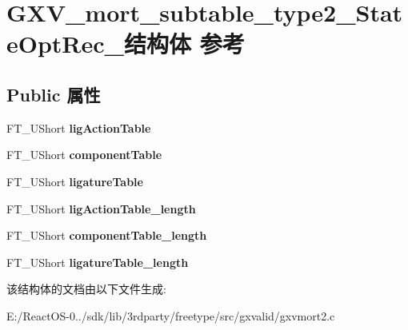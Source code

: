 \hypertarget{struct_g_x_v__mort__subtable__type2___state_opt_rec__}{}\section{G\+X\+V\+\_\+mort\+\_\+subtable\+\_\+type2\+\_\+\+State\+Opt\+Rec\+\_\+结构体 参考}
\label{struct_g_x_v__mort__subtable__type2___state_opt_rec__}
\subsection*{Public 属性}
\begin{DoxyCompactItemize}
\item 
\mbox{\label{struct_g_x_v__mort__subtable__type2___state_opt_rec___a7dacb9653cfacad1fd7808d98d459ade}} 
F\+T\+\_\+\+U\+Short {\bfseries lig\+Action\+Table}
\item 
\mbox{\label{struct_g_x_v__mort__subtable__type2___state_opt_rec___a4bc582ada04e0ac8cdea2c0381e2ae5c}} 
F\+T\+\_\+\+U\+Short {\bfseries component\+Table}
\item 
\mbox{\label{struct_g_x_v__mort__subtable__type2___state_opt_rec___a6b3fda0a7f13b9661c1043f69cd2b006}} 
F\+T\+\_\+\+U\+Short {\bfseries ligature\+Table}
\item 
\mbox{\label{struct_g_x_v__mort__subtable__type2___state_opt_rec___a823b7aec8c245846e2765c4271b6fbdf}} 
F\+T\+\_\+\+U\+Short {\bfseries lig\+Action\+Table\+\_\+length}
\item 
\mbox{\label{struct_g_x_v__mort__subtable__type2___state_opt_rec___ab9dd94ae444a1041a4b5d15aeb5b762b}} 
F\+T\+\_\+\+U\+Short {\bfseries component\+Table\+\_\+length}
\item 
\mbox{\label{struct_g_x_v__mort__subtable__type2___state_opt_rec___a5a84c4f5f16c584aafbc43f0b84f681b}} 
F\+T\+\_\+\+U\+Short {\bfseries ligature\+Table\+\_\+length}
\end{DoxyCompactItemize}


该结构体的文档由以下文件生成\+:\begin{DoxyCompactItemize}
\item 
E\+:/\+React\+O\+S-\/0../sdk/lib/3rdparty/freetype/src/gxvalid/gxvmort2.\+c\end{DoxyCompactItemize}
